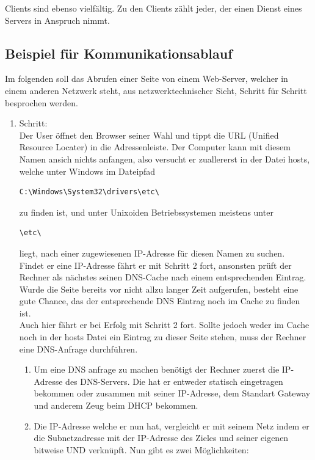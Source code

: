\documentclass[12pt,a4paper]{report}
\begin{document}
Clients sind ebenso vielfältig. Zu den Clients zählt jeder, der einen Dienst eines Servers in Anspruch nimmt. 
\subsection{Beispiel für Kommunikationsablauf}
Im folgenden soll das Abrufen einer Seite von einem Web-Server, welcher in einem anderen Netzwerk steht, aus netzwerktechnischer Sicht, Schritt für Schritt besprochen werden.\\
\begin{enumerate}
\item Schritt:\\
Der User öffnet den Browser seiner Wahl und tippt die URL (Unified Resource Locater) in die Adressenleiste. Der Computer kann mit diesem Namen ansich nichts anfangen, also versucht er zuallererst in der Datei \glqq hosts\grqq , welche unter Windows im Dateipfad
\begin{lstlisting} 
C:\Windows\System32\drivers\etc\ 
\end{lstlisting} zu finden ist, und unter Unixoiden Betriebssystemen meistens unter 
\begin{lstlisting} 
\etc\ 
\end{lstlisting} liegt, nach einer zugewiesenen IP-Adresse für diesen Namen zu suchen.\\
Findet er eine IP-Adresse fährt er mit Schritt 2 fort, ansonsten prüft der Rechner als nächstes seinen DNS-Cache nach einem entsprechenden Eintrag. Wurde die Seite bereits vor nicht allzu langer Zeit aufgerufen, besteht eine gute Chance, das der entsprechende DNS Eintrag noch im Cache zu finden ist.\\
Auch hier fährt er bei Erfolg mit Schritt 2 fort. Sollte jedoch weder im Cache noch in der hosts Datei ein Eintrag zu dieser Seite stehen, muss der Rechner eine DNS-Anfrage durchführen.\\
\begin{enumerate}
\item Um eine DNS anfrage zu machen benötigt der Rechner zuerst die IP-Adresse des DNS-Servers. Die hat er entweder statisch eingetragen bekommen oder zusammen mit seiner IP-Adresse, dem Standart Gateway und anderem Zeug beim DHCP bekommen.
\item Die IP-Adresse welche er nun hat, vergleicht er mit seinem Netz indem er die Subnetzadresse mit der IP-Adresse des Zieles und seiner eigenen bitweise UND verknüpft. Nun gibt es zwei Möglichkeiten: 
\begin{itemize}

\end{itemize}
\end{enumerate}
\end{enumerate}
\end{document}

